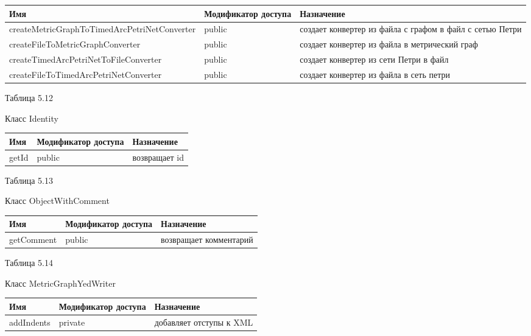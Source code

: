 \documentclass{../TechDoc}
\begin{document}
	\begin{tabular}{|p{9cm}|p{2cm}|p{5cm}|}
		\hline
		\textbf{Имя} & \textbf{Модификатор доступа} & \textbf{Назначение} \\
		\hline
		createMetricGraphToTimedArcPetriNetConverter& public & создает конвертер из файла с графом в файл с сетью Петри \\
		\hline
		createFileToMetricGraphConverter&public & создает конвертер из файла в метрический граф \\
		\hline
		createTimedArcPetriNetToFileConverter& public& создает конвертер из сети Петри в файл\\
		\hline
		createFileToTimedArcPetriNetConverter& public& создает конвертер из файла в сеть петри\\
		
		\hline
	\end{tabular}

	\begin{flushright}
		Таблица 5.12
	\end{flushright}
	Класс Identity
	
	\begin{tabular}{|p{5cm}|p{5cm}|p{5cm}|}
		\hline
		\textbf{Имя} & \textbf{Модификатор доступа} & \textbf{Назначение} \\
		\hline
		getId& public& возвращает id\\
		
		\hline
	\end{tabular}

	\begin{flushright}
		Таблица 5.13
	\end{flushright}
	Класс ObjectWithComment
	
	\begin{tabular}{|p{5cm}|p{5cm}|p{5cm}|}
		\hline
		\textbf{Имя} & \textbf{Модификатор доступа} & \textbf{Назначение} \\
		\hline
		getComment &public & возвращает комментарий \\
		
		\hline
	\end{tabular}
	\begin{flushright}
		Таблица 5.14
	\end{flushright}
	Класс MetricGraphYedWriter
	
	\begin{tabular}{|p{5cm}|p{5cm}|p{5cm}|}
		\hline
		\textbf{Имя} & \textbf{Модификатор доступа} & \textbf{Назначение} \\
		\hline
		addIndents& private & добавляет отступы к XML\\
		
		\hline
	\end{tabular}
	
\end{document}

